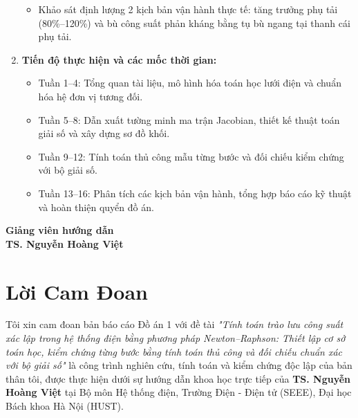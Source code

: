 \documentclass[12pt,a4paper,oneside]{report}
\begin{document}
\begin{spacing}{1.08}
\begin{enumerate}
\begin{itemize}
        \item Khảo sát định lượng 2 kịch bản vận hành thực tế: tăng trưởng phụ tải (80\%--120\%) và bù công suất phản kháng bằng tụ bù ngang tại thanh cái phụ tải.
    \end{itemize}
    \item \textbf{Tiến độ thực hiện và các mốc thời gian:}
    \begin{itemize}\setlength{\itemsep}{0pt}\setlength{\parskip}{0pt}
        \item Tuần 1--4: Tổng quan tài liệu, mô hình hóa toán học lưới điện và chuẩn hóa hệ đơn vị tương đối.
        \item Tuần 5--8: Dẫn xuất tường minh ma trận Jacobian, thiết kế thuật toán giải số và xây dựng sơ đồ khối.
        \item Tuần 9--12: Tính toán thủ công mẫu từng bước và đối chiếu kiểm chứng với bộ giải số.
        \item Tuần 13--16: Phân tích các kịch bản vận hành, tổng hợp báo cáo kỹ thuật và hoàn thiện quyển đồ án.
    \end{itemize}
\end{enumerate}

\vspace{15pt}
\begin{flushright}
\begin{minipage}[t]{0.5\textwidth}
    \centering
    \textbf{Giảng viên hướng dẫn}\\[35pt]
    \textbf{TS. Nguyễn Hoàng Việt}
\end{minipage}
\end{flushright}
\end{spacing}

\clearpage

\chapter*{Lời Cam Đoan}

Tôi xin cam đoan bản báo cáo Đồ án 1 với đề tài \textit{"Tính toán trào lưu công suất xác lập trong hệ thống điện bằng phương pháp Newton--Raphson: Thiết lập cơ sở toán học, kiểm chứng từng bước bằng tính toán thủ công và đối chiếu chuẩn xác với bộ giải số"} là công trình nghiên cứu, tính toán và kiểm chứng độc lập của bản thân tôi, được thực hiện dưới sự hướng dẫn khoa học trực tiếp của \textbf{TS. Nguyễn Hoàng Việt} tại Bộ môn Hệ thống điện, Trường Điện - Điện tử (SEEE), Đại học Bách khoa Hà Nội (HUST).
\end{document}
